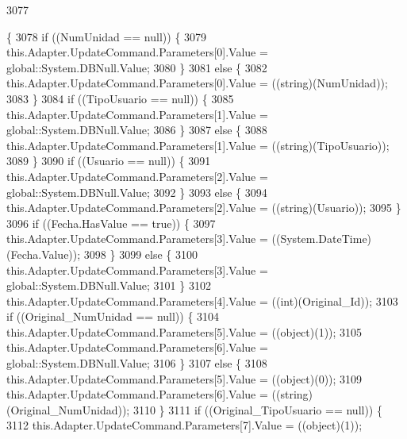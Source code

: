 \begin{DoxyCode}
3077                                                                                                            
                                                                                                                  
                                                                                          \{
3078             \textcolor{keywordflow}{if} ((NumUnidad == null)) \{
3079                 this.Adapter.UpdateCommand.Parameters[0].Value = global::System.DBNull.Value;
3080             \}
3081             \textcolor{keywordflow}{else} \{
3082                 this.Adapter.UpdateCommand.Parameters[0].Value = ((string)(NumUnidad));
3083             \}
3084             \textcolor{keywordflow}{if} ((TipoUsuario == null)) \{
3085                 this.Adapter.UpdateCommand.Parameters[1].Value = global::System.DBNull.Value;
3086             \}
3087             \textcolor{keywordflow}{else} \{
3088                 this.Adapter.UpdateCommand.Parameters[1].Value = ((string)(TipoUsuario));
3089             \}
3090             \textcolor{keywordflow}{if} ((Usuario == null)) \{
3091                 this.Adapter.UpdateCommand.Parameters[2].Value = global::System.DBNull.Value;
3092             \}
3093             \textcolor{keywordflow}{else} \{
3094                 this.Adapter.UpdateCommand.Parameters[2].Value = ((string)(Usuario));
3095             \}
3096             \textcolor{keywordflow}{if} ((Fecha.HasValue == \textcolor{keyword}{true})) \{
3097                 this.Adapter.UpdateCommand.Parameters[3].Value = ((System.DateTime)(Fecha.Value));
3098             \}
3099             \textcolor{keywordflow}{else} \{
3100                 this.Adapter.UpdateCommand.Parameters[3].Value = global::System.DBNull.Value;
3101             \}
3102             this.Adapter.UpdateCommand.Parameters[4].Value = ((int)(Original\_Id));
3103             \textcolor{keywordflow}{if} ((Original\_NumUnidad == null)) \{
3104                 this.Adapter.UpdateCommand.Parameters[5].Value = ((object)(1));
3105                 this.Adapter.UpdateCommand.Parameters[6].Value = global::System.DBNull.Value;
3106             \}
3107             \textcolor{keywordflow}{else} \{
3108                 this.Adapter.UpdateCommand.Parameters[5].Value = ((object)(0));
3109                 this.Adapter.UpdateCommand.Parameters[6].Value = ((string)(Original\_NumUnidad));
3110             \}
3111             \textcolor{keywordflow}{if} ((Original\_TipoUsuario == null)) \{
3112                 this.Adapter.UpdateCommand.Parameters[7].Value = ((object)(1));

\end{DoxyCode}
